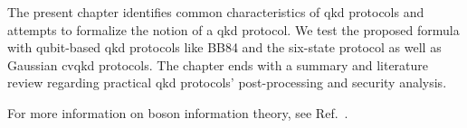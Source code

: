 The present chapter identifies common characteristics of \gls{qkd} protocols and attempts to formalize the notion of a \gls{qkd} protocol.
We test the proposed formula with qubit-based \gls{qkd} protocols like BB84 and the six-state protocol as well as Gaussian \gls{cvqkd} protocols.
The chapter ends with a summary and literature review regarding practical \gls{qkd} protocols' post-processing and security analysis.

For more information on boson information theory, see Ref.~\cite{Weedbrook2012,Ferraro2005}.



